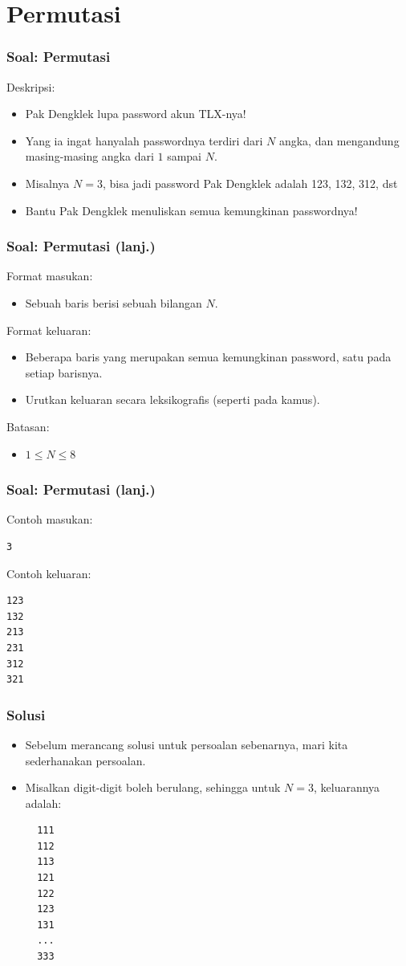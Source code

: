\section{Permutasi}
\frame{\sectionpage}


\begin{frame}
\frametitle{Soal: Permutasi}
Deskripsi:
\begin{itemize}
  \item Pak Dengklek lupa password akun TLX-nya!
  \item Yang ia ingat hanyalah passwordnya terdiri dari $N$ angka, dan mengandung masing-masing angka dari $1$ sampai $N$.
  \item Misalnya $N=3$, bisa jadi password Pak Dengklek adalah 123, 132, 312, dst
  \item Bantu Pak Dengklek menuliskan semua kemungkinan passwordnya!
\end{itemize}
\end{frame}

\begin{frame}
\frametitle{Soal: Permutasi (lanj.) }
Format masukan:
\begin{itemize}
    \item Sebuah baris berisi sebuah bilangan $N$.
\end{itemize}
Format keluaran:
\begin{itemize}
    \item Beberapa baris yang merupakan semua kemungkinan password, satu pada setiap barisnya.
    \item Urutkan keluaran secara leksikografis (seperti pada kamus).
\end{itemize}
Batasan:
\begin{itemize}
    \item $1 \le N \le 8$
\end{itemize}
\end{frame}

\begin{frame}[fragile]
\frametitle{Soal: Permutasi (lanj.) }
Contoh masukan:
\begin{lstlisting}
3
\end{lstlisting}

\vfill

Contoh keluaran:
\begin{lstlisting}
123
132
213
231
312
321
\end{lstlisting}
\end{frame}

\begin{frame}[fragile]
\frametitle{Solusi}
\begin{itemize}
  \item Sebelum merancang solusi untuk persoalan sebenarnya, mari kita sederhanakan persoalan.
  \item Misalkan digit-digit boleh berulang, sehingga untuk $N=3$, keluarannya adalah:
  
  \begin{lstlisting}
  111
  112
  113
  121
  122
  123
  131
  ...
  333
  \end{lstlisting}
\end{itemize}
\end{frame}

